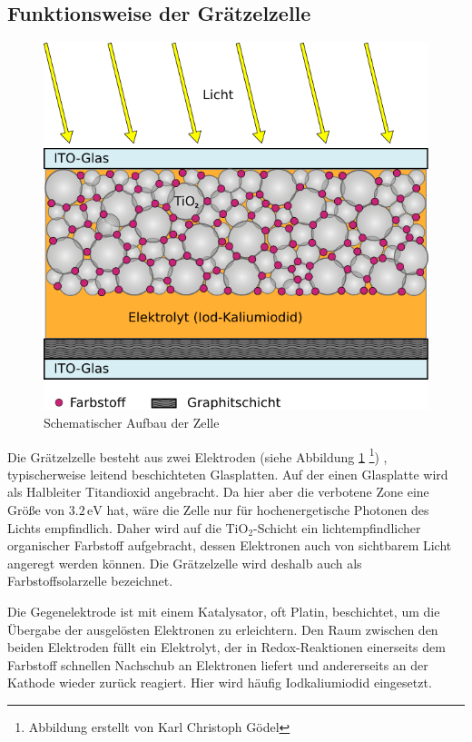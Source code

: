 \documentclass[11pt]{scrartcl}
\newcommand{\unit}[1]{\ensuremath{\,\mathrm{#1}}} %
\begin{document}
\subsection{Funktionsweise der Gr\"atzelzelle}
\begin{figure}[ht]
\begin{center}
\includegraphics[height=0.4\textheight]{images/skizze.png}
\end{center}
\vspace{-1.5\baselineskip}
\caption{Schematischer Aufbau der Zelle}
\label{skizze}
\end{figure}
Die Gr\"atzelzelle besteht aus zwei Elektroden (siehe Abbildung \ref{skizze} \footnote{Abbildung erstellt von Karl Christoph Gödel}) , typischerweise leitend beschichteten Glasplatten. Auf der einen Glasplatte wird als Halbleiter Titandioxid angebracht. Da hier aber die verbotene Zone eine Gr\"o\ss{}e von $3.2\unit{eV}$ hat, w\"are die Zelle nur f\"ur hochenergetische Photonen des Lichts empfindlich. Daher wird auf die TiO$_{2}$-Schicht ein lichtempfindlicher organischer Farbstoff aufgebracht, dessen Elektronen auch von sichtbarem Licht angeregt werden k\"onnen. Die Gr\"atzelzelle wird deshalb auch als Farbstoffsolarzelle bezeichnet.

Die Gegenelektrode ist mit einem Katalysator, oft Platin, beschichtet, um die \"Ubergabe der ausgel\"osten Elektronen zu erleichtern. Den Raum zwischen den beiden Elektroden f\"ullt ein Elektrolyt, der in Redox-Reaktionen einerseits dem Farbstoff schnellen Nachschub an Elektronen liefert und andererseits an der Kathode wieder zur\"uck reagiert. Hier wird h\"aufig Iodkaliumiodid eingesetzt.
\end{document}

